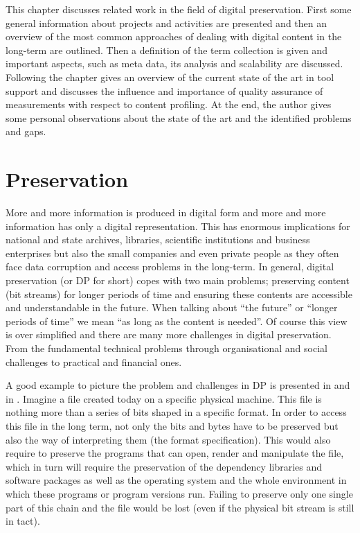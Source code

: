 This chapter discusses related work in the field of digital preservation. First some general information about projects and activities are presented and then an overview of the most common approaches of dealing with digital content in the long-term are outlined. Then a definition of the term collection is given and important aspects, such as meta data, its analysis and scalability are discussed. Following the chapter gives an overview of the current state of the art in tool support and discusses the influence and importance of quality assurance of measurements with respect to content profiling. At the end, the author gives some personal observations about the state of the art and the identified problems and gaps.

\section{Preservation}
More and more information is produced in digital form and more and more information has only a digital representation. This has enormous implications for national and state archives, libraries, scientific institutions and business enterprises but also the small companies and even private people as they often face data corruption and access problems in the long-term.
In general, digital preservation (or DP for short) copes with two main problems; preserving content (bit streams) for longer periods of time and ensuring these contents are accessible and understandable in the future. When talking about ``the future'' or ``longer periods of time'' we mean ``as long as the content is needed''.
Of course this view is over simplified and there are many more challenges in digital preservation. From the fundamental technical problems through organisational and social challenges to practical and financial ones.

A good example to picture the problem and challenges in DP is presented in \cite{Lorie:2001:LTP:379437.379726} and in \cite{Rauber:2009:dpchallenges}. Imagine a file created today on a specific physical machine. This file is nothing more than a series of bits shaped in a specific format. In order to access this file in the long term, not only the bits and bytes have to be preserved but also the way of interpreting them (the format specification). This would also require to preserve the programs that can open, render and manipulate the file, which in turn will require the preservation of the dependency libraries and software packages as well as the operating system and the whole environment in which these programs or program versions run. Failing to preserve only one single part of this chain and the file would be lost (even if the physical bit stream is still in tact).

